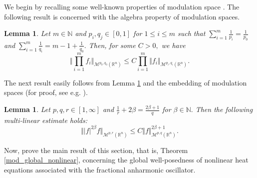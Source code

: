 \documentclass[12pt, reqno]{amsart}
\newcommand{\M}{\mathcal{M}}
\newtheorem{lemma}[theorem]{Lemma}
\theoremstyle{definition}
\theoremstyle{remark}
\numberwithin{equation}{section}
\begin{document}
We begin by recalling some well-known properties of modulation space \cite{feich:mod,than:hs}. The following result is concerned with the algebra property of modulation spaces. 
\begin{lemma} \label{lm}
	Let $m \in \mathbb{N}$ and $p_i,q_j \in [0, 1]$ for $1\leq i \leq m$ such that $\sum_{i=1}^m \frac{1}{p_i}=\frac{1}{p_0}$ and $\sum_{i=1}^m \frac{1}{q_i}=m-1+\frac{1}{q_0}.$ Then, for some $C>0,$ we have
	$$\Bigg\Vert \prod_{i=1}^m f_i \Bigg\Vert_{\M^{p_0,q_0}(\mathbb{R}^n)}\leq C \prod_{i=1}^m \Vert f_i \Vert_{\M^{p_i,q_i}(\mathbb{R}^n)}.$$
\end{lemma}
The next result easily follows from Lemma \ref{lm} and the embedding of modulation spaces (for proof, see e.g. \cite{than:hs}). 
\begin{lemma} \label{multiesti} Let $p,q,r \in [1, \infty]$ and $\frac{1}{r}+2\beta=\frac{2\beta+1}{q}$ for $\beta \in \mathbb{N}.$
	Then the following multi-linear estimate holds:
	$$\Vert |f|^{2\beta} f \Vert_{\M^{p, r}(\mathbb{R}^n)} \leq C \Vert f \Vert_{\M^{p,q}(\mathbb{R}^n)}^{2\beta+1}.$$
\end{lemma}


Now, prove the main result of this section, that is, Theorem \ref{mod_global_nonlinear}, concerning the global well-posedness of nonlinear heat equations associated with the fractional anharmonic oscillator. 
\end{document}

